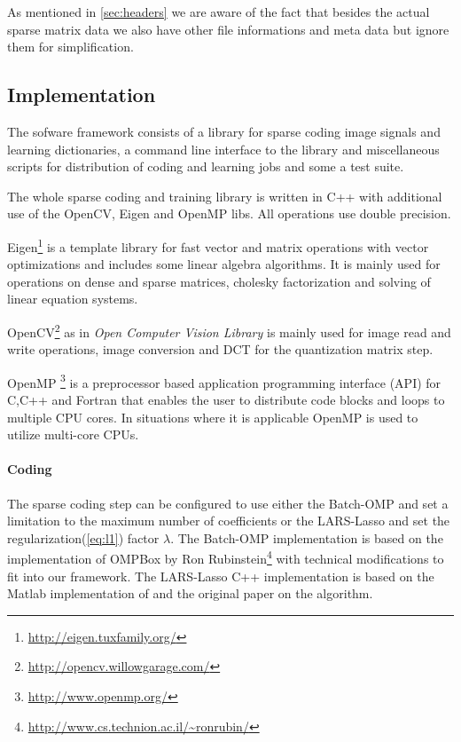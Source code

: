 
As mentioned in \ref{sec:headers} we are aware of the fact that besides
the actual sparse matrix data we also have other file informations and meta
data but ignore them for simplification.
  
\subsection{Implementation}
The sofware framework consists of a library for sparse coding image signals 
and learning dictionaries, a command line interface to the library and
miscellaneous scripts for distribution of coding and learning jobs and
some a test suite.

The whole sparse coding and training library is written in C++ with
additional use of the OpenCV, Eigen and OpenMP libs. All operations use double
precision. 

Eigen\footnote{\url{http://eigen.tuxfamily.org/}}
is a template library for fast vector and matrix operations with vector
optimizations and includes some linear algebra algorithms. It is mainly used for
operations on dense and sparse matrices, cholesky factorization and solving of
linear equation systems. 

OpenCV\footnote{\url{http://opencv.willowgarage.com/}} as
in \emph{Open Computer Vision Library} is mainly used for
image read and write operations, image conversion and DCT for the
quantization matrix step. 

OpenMP \footnote{\url{http://www.openmp.org/}} is a preprocessor
based application programming interface (API) for C,C++ and Fortran that enables
the user to distribute code blocks and loops to multiple CPU cores. In
situations where it is applicable OpenMP is used to utilize multi-core CPUs. 


\paragraph{Coding}
The sparse coding step can be configured to use either the Batch-OMP and 
set a limitation to the maximum number of coefficients or the LARS-Lasso 
and set the regularization(\ref{eq:l1}) factor $\lambda$.
The Batch-OMP implementation is based on the implementation
of OMPBox by Ron
 Rubinstein\footnote{\url{http://www.cs.technion.ac.il/~ronrubin/}} with
technical modifications to fit into our
framework. The LARS-Lasso C++ implementation is based on the Matlab
implementation of\cite{Strand2005} and the original
paper\cite{Efron2004} on the algorithm.

